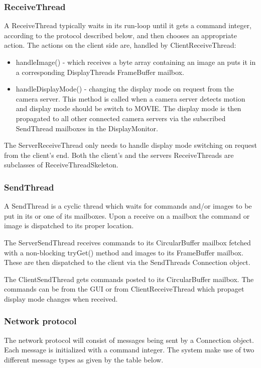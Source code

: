 \documentclass[8pt,titlepage]{article}
\begin{document}
\subsubsection{ReceiveThread}
A ReceiveThread typically waits in its run-loop until it gets a command integer, according to the protocol described below, and then chooses an appropriate action. The actions on the client side are, handled by ClientReceiveThread:
\begin{itemize}
\item handleImage() - which receives a byte array containing an image an puts it in a corresponding DisplayThreads FrameBuffer mailbox.
\item handleDisplayMode() - changing the display mode on request from the camera server. This method is called when a camera server detects motion and display mode should be switch to MOVIE. The display mode is then propagated to all other connected camera servers via the subscribed SendThread mailboxes in the DisplayMonitor.
\end{itemize}

The ServerReceiveThread only needs to handle display mode switching on request from the client’s end. Both the client’s and the servers ReceiveThreads are subclasses of ReceiveThreadSkeleton.

\subsubsection{SendThread}
A SendThread is a cyclic thread which waits for commands and/or images to be put in its or one of its mailboxes. Upon a receive on a mailbox the command or image is dispatched to its proper location. 

The ServerSendThread receives commands to its CircularBuffer mailbox fetched with a non-blocking tryGet() method and images to its FrameBuffer mailbox. These are then dispatched to the client via the SendThreads Connection object.

The ClientSendThread gets commands posted to its CircularBuffer mailbox. The commands can be from the GUI or from ClientReceiveThread which propaget display mode changes when received.

\subsubsection{Network protocol}
The network protocol will consist of messages being sent by a Connection object. Each message is initialized with a command integer. The system make use of two different message types as given by the table below.
\end{document}
